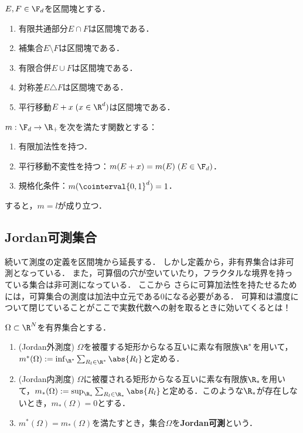 \documentclass[uplatex, dvipdfmx]{jsreport}
\begin{document}
\begin{lemma}
    $E,F\in\F_d$を区間塊とする．
    \begin{enumerate}
        \item 有限共通部分$E\cap F$は区間塊である．
        \item 補集合$E\setminus F$は区間塊である．
        \item 有限合併$E\cup F$は区間塊である．
        \item 対称差$E\triangle F$は区間塊である．
        \item 平行移動$E+x\;(x\in\R^d)$は区間塊である．
    \end{enumerate}
\end{lemma}

\begin{proposition}[区間塊上のLebesgue測度の特徴付け]
    $m:\F_d\to\R_+$を次を満たす関数とする：
    \begin{enumerate}
        \item 有限加法性を持つ．
        \item 平行移動不変性を持つ：$m(E+x)=m(E)\;(E\in\F_d)$．
        \item 規格化条件：$m(\cointerval{0,1}^d)=1$．
    \end{enumerate}
    すると，$m=l$が成り立つ．
\end{proposition}

\subsection{Jordan可測集合}

\begin{tcolorbox}[colframe=ForestGreen, colback=ForestGreen!10!white,breakable,colbacktitle=ForestGreen!40!white,coltitle=black,fonttitle=\bfseries\sffamily,
title=有限加法族上の有限加法的測度]
    続いて測度の定義を区間塊から延長する．
    しかし定義から，非有界集合は非可測となっている．
    また，可算個の穴が空いていたり，フラクタルな境界を持っている集合は非可測になっている．
    ここから
    さらに可算加法性を持たせるためには，可算集合の測度は加法中立元である$0$になる必要がある．
    可算和は濃度について閉じていることがここで実数代数への射を取るときに効いてくるとは！
\end{tcolorbox}

\begin{definition}
    $\Omega\subset\R^N$を有界集合とする．
    \begin{enumerate}
        \item (Jordan外測度) $\Omega$を被覆する矩形からなる互いに素な有限族$\R^*$を用いて，$m^*(\Omega):=\inf_{\R^*}\sum_{R_l\in\R^*}\abs{R_l}$と定める．
        \item (Jordan内測度) $\Omega$に被覆される矩形からなる互いに素な有限族$\R_*$を用いて，$m_*(\Omega):=\sup_{\R_*}\sum_{R_l\in\R_*}\abs{R_l}$と定める．このような$\R_*$が存在しないとき，$m_*(\Omega)=0$とする．
        \item $m^*(\Omega)=m_*(\Omega)$を満たすとき，集合$\Omega$を\textbf{Jordan可測}という．
    \end{enumerate}
\end{definition}
\end{document}
